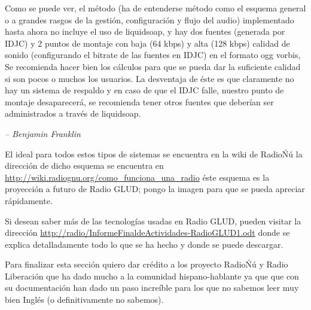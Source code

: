 \begin{multicols}{2}



Como se puede ver, el método (ha de entenderse método como el esquema general o a grandes rasgos de la gestión, configuración y flujo del audio) implementado hasta ahora no incluye el uso de liquidsoap, y hay dos fuentes (generada por IDJC) y 2 puntos de montaje con baja (64 kbps) y alta (128 kbps) calidad de sonido (configurando el bitrate de las fuentes en IDJC) en el formato ogg vorbis, Se recomienda hacer bien los cálculos para que se pueda dar la suficiente calidad si son pocos o muchos los usuarios.\cite{ref5} La desventaja de éste es que claramente no hay un sistema de respaldo y en caso de que el IDJC falle, nuestro punto de montaje desaparecerá, se recomienda tener otros fuentes que deberían ser administrados a través de liquidsoap.

\begin{entradilla} %
{\em {\color{introcolor}{``Aquel que sacrifica la libertad por seguridad, no merece ninguna de las dos''}} -- Benjamin Franklin}
\end{entradilla}

El ideal para todos estos tipos de sistemas se encuentra en la wiki de RadioŃú la dirección de dicho esquema se encuentra en \url{http://wiki.radiognu.org/como_funciona_una_radio} éste esquema es la proyección a futuro de Radio GLUD; pongo la imagen para que se pueda apreciar rápidamente.

\begin{center}
\end{center}

Si desean saber más de las tecnologías usadas en Radio GLUD, pueden visitar la dirección \url{http://radio/InformeFinaldeActividades-RadioGLUD1.odt} donde se explica detalladamente todo lo que se ha hecho y donde se puede descargar.

Para finalizar esta sección quiero dar crédito a los proyecto RadioŃú y Radio Liberación que ha dado mucho a la comunidad hispano-hablante ya que que con su documentación han dado un paso increíble para los que no sabemos leer muy bien Inglés (o definitivamente no sabemos).





\end{multicols}
